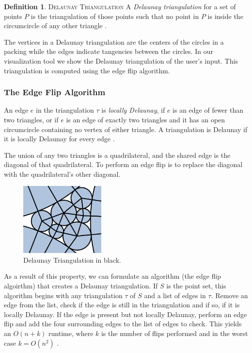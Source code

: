\documentclass[11pt]{article}
\theoremstyle{definition}
\newtheorem{definition}{Definition}[section]
\begin{document}
  	\theoremstyle{definition}
  	\begin{definition}{\textsc{Delaunay Triangulation}}
		A \emph{Delaunay triangulation} for a set of points $P$ is the triangulation of those points such that no point in $P$ is inside the circumcircle of any other triangle \cite{meshGeneration}.
	\end{definition}
	
	The vertices in a Delaunay triangulation are the centers of the circles in a packing while the edges indicate tangencies between the circles.
	 In our visualization tool we show the Delaunay triangulation of the user's input. 
	 This triangulation is computed using the edge flip algorithm.	
	 
\subsubsection{The Edge Flip Algorithm}
	An edge $e$ in the triangulation $\tau$ is \emph{locally Delaunay}, if $e$ is an edge of fewer than two triangles, or if $e$ is an edge of exactly two triangles and it has an open circumcircle containing no vertex of either triangle. 
	A triangulation is Delaunay if it is locally Delaunay for every edge \cite{meshGeneration}.

	The union of any two triangles is a quadrilateral, and the shared edge is the diagonal of that quadrilateral. 
	To perform an edge flip is to replace the diagonal with the quadrilateral's other diagonal.

	\begin{figure}
  		\begin{center}
    		\includegraphics[width=0.38\textwidth]{delaunayemph}
  		\end{center}
  		\caption{Delaunay Triangulation in black.}
	\end{figure}
	As a result of this property, we can formulate an algorithm (the edge flip algoirthm) that creates a Delaunay triangulation. 
	If $S$ is the point set, this algorithm begins with any triangulation $\tau$ of $S$ and a list of edges in $\tau$. 
	Remove an edge from the list, check if the edge is still in the triangulation and if so, if it is locally Delaunay. 
	If the edge is present but not locally Delaunay, perform an edge flip and add the four surrounding edges to the list of edges to check. 
	This yields an $O(n + k)$ runtime, where $k$ is the number of flips performed and in the worst case $k = O(n^2)$ \cite{meshGeneration}.
\end{document}
